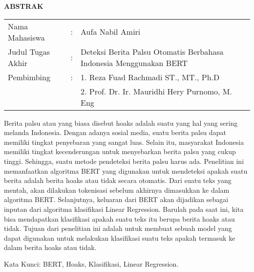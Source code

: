 \begin{center}
  \large\textbf{ABSTRAK}
\end{center}


\vspace{2ex}

\begingroup
\setlength{\tabcolsep}{0pt}

\noindent
\begin{tabularx}{\textwidth}{l >{\centering}m{2em} X}
  Nama Mahasiswa    & : & Aufa Nabil Amiri                                                   \\

  Judul Tugas Akhir & : & Deteksi Berita Palsu Otomatis Berbahasa Indonesia Menggunakan BERT \\

  Pembimbing        & : & 1. Reza Fuad Rachmadi ST., MT., Ph.D                               \\
                    &   & 2. Prof. Dr. Ir. Mauridhi Hery Purnomo, M. Eng                     \\
\end{tabularx}
\endgroup

Berita palsu atau yang biasa disebut hoaks adalah suatu yang hal yang sering melanda Indonesia. Dengan adanya sosial media, suatu berita palsu dapat memiliki tingkat penyebaran yang sangat luas. Selain itu, masyarakat Indonesia memiliki tingkat kecenderungan untuk menyebarkan berita palsu yang cukup tinggi. Sehingga, suatu metode pendeteksi berita palsu harus ada. Penelitian ini memanfaatkan algoritma BERT yang digunakan untuk mendeteksi apakah suatu berita adalah berita hoaks atau tidak secara otomatis. Dari suatu teks yang mentah, akan dilakukan tokenisasi sebelum akhirnya dimasukkan ke dalam algoritma BERT. Selanjutnya, keluaran dari BERT akan dijadikan sebagai inputan dari algoritma klasifikasi Linear Regression.  Barulah pada saat ini, kita bisa mendapatkan klasifikasi apakah suatu teks itu berupa berita hoaks atau tidak. Tujuan dari penelitian ini adalah untuk membuat sebuah model yang dapat digunakan untuk melakukan klasifikasi suatu teks apakah termasuk ke dalam berita hoaks atau tidak.

Kata Kunci:   BERT, Hoaks, Klasifikasi, Linear Regression.

